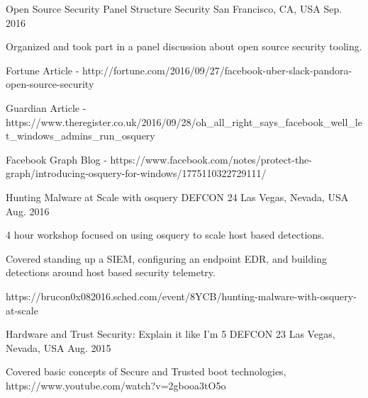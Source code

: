 \begin{cventries}

\cventry
{Open Source Security Panel} %
{Structure Security} %
{San Francisco, CA, USA} %
{Sep. 2016} %
{ %
\begin{cvitems}
\item {Organized and took part in a panel discussion about open source security tooling.}
\item {Fortune Article - http://fortune.com/2016/09/27/facebook-uber-slack-pandora-open-source-security}
\item {Guardian Article - https://www.theregister.co.uk/2016/09/28/oh\_all\_right\_says\_facebook\_well\_let\_windows\_admins\_run\_osquery}
\item {Facebook Graph Blog - https://www.facebook.com/notes/protect-the-graph/introducing-osquery-for-windows/1775110322729111/}
\end{cvitems}
}


\cventry
{Hunting Malware at Scale with osquery} %
{DEFCON 24} %
{Las Vegas, Nevada, USA} %
{Aug. 2016} %
{ %
\begin{cvitems}
\item {4 hour workshop focused on using osquery to scale host based detections.}
\item {Covered standing up a SIEM, configuring an endpoint EDR, and building detections around host based security telemetry.}
\item { https://brucon0x082016.sched.com/event/8YCB/hunting-malware-with-osquery-at-scale}
\end{cvitems}
}


\cventry
{Hardware and Trust Security: Explain it like I’m 5} %
{DEFCON 23} %
{Las Vegas, Nevada, USA} %
{Aug. 2015} %
{ %
\begin{cvitems}
\item {Covered basic concepts of Secure and Trusted boot technologies, https://www.youtube.com/watch?v=2gbooa3tO5o}
\end{cvitems}
}


\end{cventries}